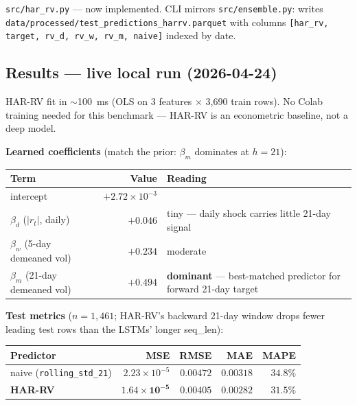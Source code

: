 \documentclass[11pt]{article}
\begin{document}
\texttt{src/har\_rv.py} --- now implemented. CLI mirrors \texttt{src/ensemble.py}: writes \texttt{data/processed/\allowbreak test\_predictions\_\allowbreak harrv.parquet} with columns \texttt{[har\_rv, target, rv\_d, rv\_w, rv\_m, naive]} indexed by date.

\subsection*{Results --- live local run (2026-04-24)}

HAR-RV fit in $\sim$100~ms (OLS on 3 features $\times$ 3{,}690 train rows). No Colab training needed for this benchmark --- HAR-RV is an econometric baseline, not a deep model.

\textbf{Learned coefficients} (match the prior: $\beta_m$ dominates at $h = 21$):

\begin{center}
\renewcommand{\arraystretch}{1.15}
\begin{tabular}{@{}l r p{7cm}@{}}
\toprule
Term & Value & Reading \\
\midrule
intercept                            & $+2.72 \times 10^{-3}$ & \\
$\beta_d$ ($|r_t|$, daily)           & $+0.046$               & tiny --- daily shock carries little 21-day signal \\
$\beta_w$ (5-day demeaned vol)       & $+0.234$               & moderate \\
$\beta_m$ (21-day demeaned vol)      & $\mathbf{+0.494}$      & \textbf{dominant} --- best-matched predictor for forward 21-day target \\
\bottomrule
\end{tabular}
\end{center}

\textbf{Test metrics} ($n = 1{,}461$; HAR-RV's backward 21-day window drops fewer leading test rows than the LSTMs' longer seq\_len):

\begin{center}
\renewcommand{\arraystretch}{1.15}
\begin{tabular}{@{}lrrrr@{}}
\toprule
Predictor & MSE & RMSE & MAE & MAPE \\
\midrule
naive (\texttt{rolling\_std\_21})        & $2.23 \times 10^{-5}$ & $0.00472$ & $0.00318$ & $34.8\%$ \\
\textbf{HAR-RV}                          & $\mathbf{1.64 \times 10^{-5}}$ & $\mathbf{0.00405}$ & $\mathbf{0.00282}$ & $\mathbf{31.5\%}$ \\
\bottomrule
\end{tabular}
\end{center}
\end{document}
